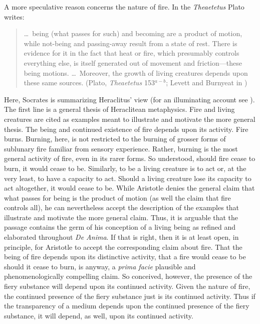 A more speculative reason concerns the nature of fire. In the \emph{Theaetetus} Plato writes:
\begin{quote}
	\ldots\ being (what passes for such) and becoming are a product of motion, while not-being and passing-away result from a state of rest. There is evidence for it in the fact that heat or fire, which presumably controls everything else, is itself generated out of movement and friction---these being motions. \ldots\ Moreover, the growth of living creatures depends upon these same sources. (Plato, \emph{Theaetetus} 153\( ^{a-b} \); Levett and Burnyeat in \citealt[70]{Cooper:1997fk})
\end{quote}
Here, Socrates is summarizing Heraclitus' view (for an illuminating account see \citealt{Wiggins:1982kx}). The first line is a general thesis of Heraclitean metaphysics. Fire and living creatures are cited as examples meant to illustrate and motivate the more general thesis. The being and continued existence of fire depends upon its activity. Fire burns. Burning, here, is not restricted to the burning of grosser forms of sublunary fire familiar from sensory experience. Rather, burning is the most general activity of fire, even in its rarer forms. So understood, should fire cease to burn, it would cease to be. Similarly, to be a living creature is to act or, at the very least, to have a capacity to act. Should a living creature lose its capacity to act altogether, it would cease to be. While Aristotle denies the general claim that what passes for being is the product of motion (as well the claim that fire controls all), he can nevertheless accept the description of the examples that illustrate and motivate the more general claim. Thus, it is arguable that the passage contains the germ of his conception of a living being as refined and elaborated throughout \emph{De Anima}. If that is right, then it is at least open, in principle, for Aristotle to accept the corresponding claim about fire. That the being of fire depends upon its distinctive activity, that a fire would cease to be should it cease to burn, is anyway, a \emph{prima facie} plausible and phenomenologically compelling claim. So conceived, however, the presence of the fiery substance will depend upon its continued activity. Given the nature of fire, the continued presence of the fiery substance just is its continued activity. Thus if the transparency of a medium depends upon the continued presence of the fiery substance, it will depend, as well, upon its continued activity. 

